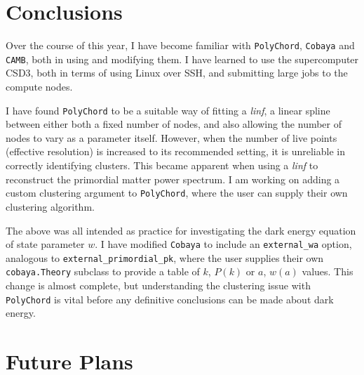 \documentclass{article}
\begin{document}
\section{Conclusions}

Over the course of this year, I have become familiar with \texttt{PolyChord}, \texttt{Cobaya} and \texttt{CAMB}, both in using and modifying them. I have learned to use the supercomputer CSD3, both in terms of using Linux over SSH, and submitting large jobs to the compute nodes. 

I have found \texttt{PolyChord} to be a suitable way of fitting a \textit{linf}, a linear spline between either both a fixed number of nodes, and also allowing the number of nodes to vary as a parameter itself. However, when the number of live points (effective resolution) is increased to its recommended setting, it is unreliable in correctly identifying clusters. This became apparent when using a \textit{linf} to reconstruct the primordial matter power spectrum. I am working on adding a custom clustering argument to \texttt{PolyChord}, where the user can supply their own clustering algorithm.

The above was all intended as practice for investigating the dark energy equation of state parameter $w$. I have modified \texttt{Cobaya} to include an \texttt{external\_wa} option, analogous to \texttt{external\_primordial\_pk}, where the user supplies their own \texttt{cobaya.Theory} subclass to provide a table of $k$, $P(k)$ or $a$, $w(a)$ values. This change is almost complete, but understanding the clustering issue with \texttt{PolyChord} is vital before any definitive conclusions can be made about dark energy.

\section{Future Plans}
\end{document}
